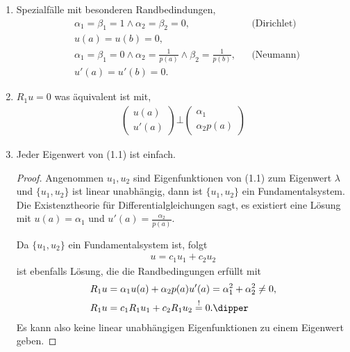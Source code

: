 \begin{bem}
\label{bem:1.33}
\begin{enumerate}[label=\arabic{*}.)]
  \item Spezialfälle mit besonderen Randbedindungen,
\begin{align*}
&\alpha_1 = \beta_1 = 1 \land \alpha_2 = \beta_2 = 0,&& \text{(Dirichlet)}\\
&u(a) = u(b) = 0,\\
&\alpha_1 = \beta_1 = 0 \land \alpha_2 = \frac{1}{p(a)} \land \beta_2 =
\frac{1}{p(b)},&&\text{(Neumann)}\\
&u'(a) = u'(b) = 0.
\end{align*}
\item $R_1u = 0$ was äquivalent ist mit,
\begin{align*}
\begin{pmatrix}
u(a)\\
u'(a)
\end{pmatrix}
\bot
\begin{pmatrix}
\alpha_1\\
\alpha_2 p(a)
\end{pmatrix}
\end{align*}
\item Jeder Eigenwert von (1.1) ist einfach.
\begin{proof}
Angenommen $u_1,u_2$ sind Eigenfunktionen von (1.1) zum Eigenwert $\lambda$ und
$\{u_1,u_2\}$ ist linear unabhängig, dann ist $\{u_1,u_2\}$ ein
Fundamentalsystem. Die Existenztheorie für Differentialgleichungen sagt, es
existiert eine Lösung mit $u(a) = \alpha_1$ und $u'(a) = \frac{\alpha_2}{p(a)}$.

Da $\{u_1,u_2\}$ ein Fundamentalsystem ist, folgt
\begin{align*}
u = c_1 u_1 + c_2 u_2
\end{align*}
ist ebenfalls Lösung, die die Randbedingungen erfüllt mit
\begin{align*}
R_1u &= \alpha_1u(a) + \alpha_2p(a)u'(a) = \alpha_1^2+\alpha_2^2\neq 0,\\
R_1 u &= c_1R_1u_1 + c_2R_1u_2 \overset{!}{=} 0.\dipper
\end{align*}
Es kann also keine linear unabhängigen Eigenfunktionen zu einem Eigenwert
geben.\qedhere\maphere
\end{proof}
\end{enumerate}
\end{bem}

